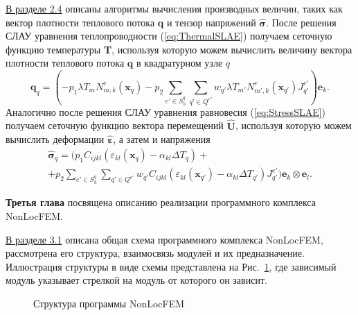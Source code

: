 \underline{В разделе 2.4} описаны алгоритмы вычисления производных величин, таких как вектор плотности теплового потока $\boldsymbol{q}$ и тензор напряжений $\widehat{\boldsymbol{\sigma}}$. После решения СЛАУ уравнения теплопроводности (\ref{eq:ThermalSLAE}) получаем сеточную функцию температуры \textbf{T}, используя которую можем вычислить величину вектора плотности теплового потока $\boldsymbol{q}$ в квадратурном узле $q$
\[
	\boldsymbol{q}_q = 
	\left(	
	-p_1 \lambda T_m N^e_{m,k} (\boldsymbol{x}_q)
	-p_2 \sum\limits_{e' \in S_h^q} \sum\limits_{q' \in Q^{e'}} w_{q'} \lambda T_{m'} N^e_{m',k} (\boldsymbol{x}_{q'}) J^{e'}_{q'}
	\right) \boldsymbol{e}_k.
\]
Аналогично после решения СЛАУ уравнения равновесия (\ref{eq:StressSLAE}) получаем сеточную функцию вектора перемещений  $\widehat{\boldsymbol{U}}$, используя которую можем вычислить деформации $\widehat{\boldsymbol{\varepsilon}}$, а затем и напряжения
\begin{multline*}
	\widehat{\boldsymbol{\sigma}}_q =
	\Biggr(
	p_1 C_{ijkl} \left(\varepsilon_{kl} (\boldsymbol{x}_q) - \alpha_{kl} \Delta T_q \right)
	+\\+
	p_2 \sum\limits_{e' \in S_h^q} \sum\limits_{q' \in Q^{e'}} w_{q'} C_{ijkl} \left(\varepsilon_{kl} (\boldsymbol{x}_{q'}) - \alpha_{kl} \Delta T_{q'} \right) J^{e'}_{q'}
	\Biggr) \boldsymbol{e}_k \otimes \boldsymbol{e}_l.
\end{multline*}



\textbf{Третья глава} посвящена описанию реализации программного комплекса NonLocFEM.

\underline{В разделе 3.1} описана общая схема программного комплекса NonLocFEM, рассмотрена его структура, взаимосвязь модулей и их предназначение. Иллюстрация структуры в виде схемы представлена на Рис.~\ref{pic:NonLocFEMSchema}, где зависимый модуль указывает стрелкой на модуль от которого он зависит.

\begin{figure}[ht]
    \caption{Структура программы NonLocFEM}\label{pic:NonLocFEMSchema}
\end{figure}

